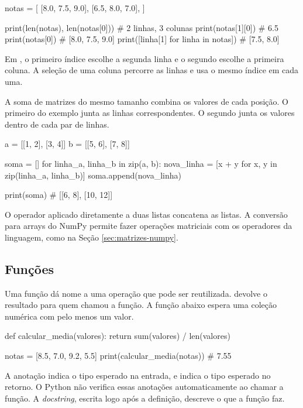 \begin{exemplo}
notas = [
    [8.0, 7.5, 9.0],
    [6.5, 8.0, 7.0],
]

print(len(notas), len(notas[0]))       # 2 linhas, 3 colunas
print(notas[1][0])                     # 6.5
print(notas[0])                        # [8.0, 7.5, 9.0]
print([linha[1] for linha in notas])   # [7.5, 8.0]
\end{exemplo}

Em , o primeiro índice escolhe a segunda linha e o segundo escolhe a primeira coluna. A seleção de uma coluna percorre as linhas e usa o mesmo índice em cada uma.

A soma de matrizes do mesmo tamanho combina os valores de cada posição. O primeiro  do exemplo junta as linhas correspondentes. O segundo junta os valores dentro de cada par de linhas.

\begin{exemplo}
a = [[1, 2], [3, 4]]
b = [[5, 6], [7, 8]]

soma = []
for linha_a, linha_b in zip(a, b):
    nova_linha = [x + y for x, y in zip(linha_a, linha_b)]
    soma.append(nova_linha)

print(soma)  # [[6, 8], [10, 12]]
\end{exemplo}

O operador \codigo{+} aplicado diretamente a duas listas concatena as listas. A conversão para arrays do NumPy permite fazer operações matriciais com os operadores da linguagem, como na Seção \ref{sec:matrizes-numpy}.

\subsection{Funções}

Uma função dá nome a uma operação que pode ser reutilizada.  devolve o resultado para quem chamou a função. A função abaixo espera uma coleção numérica com pelo menos um valor.

\begin{exemplo}
def calcular_media(valores):
    return sum(valores) / len(valores)

notas = [8.5, 7.0, 9.2, 5.5]
print(calcular_media(notas))  # 7.55
\end{exemplo}

A anotação  indica o tipo esperado na entrada, e  indica o tipo esperado no retorno. O Python não verifica essas anotações automaticamente ao chamar a função. A \emph{docstring}, escrita logo após a definição, descreve o que a função faz.

